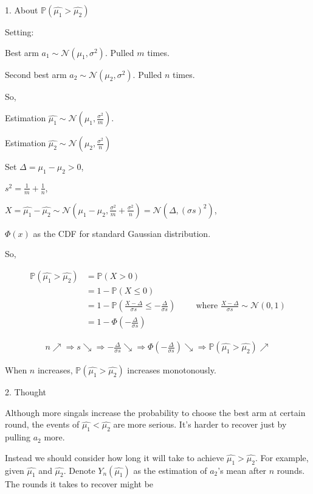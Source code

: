 \documentclass[fleqn]{article}
\def\PP{{\mathbb P}}\def\QQ{{\mathbb Q}}\def\RR{{\mathbb R}}
\begin{document}
1. About $\PP(\hat{\mu_1}>\hat{\mu_2})$
\medskip

Setting:

Best arm $a_1\sim\mathcal{N}(\mu_1, \sigma^2)$. Pulled $m$ times.

Second best arm $a_2\sim\mathcal{N}(\mu_2, \sigma^2)$. Pulled $n$ times.
\medskip

So,

Estimation $\hat{\mu_1}\sim\mathcal{N}(\mu_1, \frac{\sigma^2}{m})$.

Estimation $\hat{\mu_2}\sim\mathcal{N}(\mu_2, \frac{\sigma^2}{n})$
\medskip

Set $\Delta=\mu_1-\mu_2>0$, 

$s^2=\frac{1}{m}+\frac{1}{n}$,

$X=\hat{\mu_1}-\hat{\mu_2}\sim\mathcal{N}(\mu_1-\mu_2, \frac{\sigma^2}{m}+\frac{\sigma^2}{n})=\mathcal{N}(\Delta, (\sigma s)^2)$,

$\Phi(x)$ as the CDF for standard Gaussian distribution.
\medskip

So, 

\begin{align*}
\PP(\hat{\mu_1}>\hat{\mu_2}) &= \PP(X>0)\\
 &= 1-\PP(X\le 0)\\
 &= 1-\PP(\frac{X-\Delta}{\sigma s}\le -\frac{\Delta}{\sigma s})\hspace{1cm}\text{where $\frac{X-\Delta}{\sigma s}\sim \mathcal{N}(0,1)$}\\
 &=1-\Phi(-\frac{\Delta}{\sigma s})
\end{align*}

\begin{align*} 
n \nearrow \Rightarrow s \searrow \Rightarrow -\frac{\Delta}{\sigma s} \searrow \Rightarrow \Phi(-\frac{\Delta}{\sigma s}) \searrow \Rightarrow \PP(\hat{\mu_1}>\hat{\mu_2}) \nearrow
\end{align*} 

When $n$ increases, $\PP(\hat{\mu_1}>\hat{\mu_2})$ increases monotonously.  
\bigskip

2. Thought
\medskip

Although more singals increase the probability to choose the best arm at certain round, the events of $\hat{\mu_1}<\hat{\mu_2}$ are more serious. It's harder to recover just by pulling $a_2$ more.

Instead we should consider how long it will take to achieve $\hat{\mu_1}>\hat{\mu_2}$. For example, given $\hat{\mu_1}$ and $\hat{\mu_2}$. Denote $Y_n(\hat{\mu_1})$ as the estimation of $a_2$'s mean after $n$ rounds. The rounds it takes to recover might be 
\end{document}
